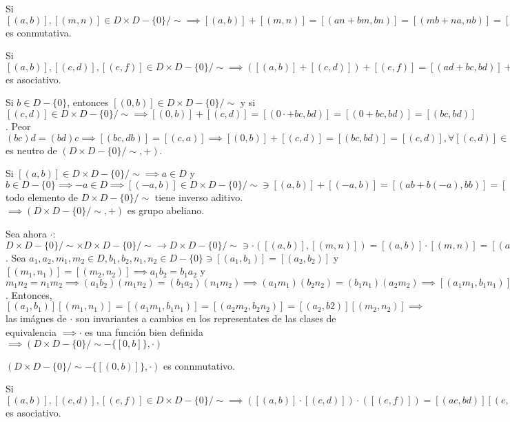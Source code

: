\begin{teorema}[3C]
\begin{dem}
        \bigbreak 
        Si $\left[(a,b)\right],\left[(m,n)\right]\in D\times D-\{0\}/\sim\implies \left[(a,b)\right]+\left[(m,n)\right]=\left[(an+bm,bn)\right]=\left[(mb+na,nb)\right]=\left[(m,n)\right]+[(a,b)]\implies \left(D\times D-\{0\}/\sim, +\right)$ es conmutativa.         \bigbreak 

        Si $[(a,b)],[(c,d)],[(e,f)]\in D\times D-\{0\}/\sim\implies \left([(a,b)]+[(c,d)]\right)+ [(e,f)]= [(ad+bc,bd)]+[(e,f)]=[(ad+bc)f+(bd)e,(bd)f]=\left[(adf+bcf+bde,bdf)\right]= \left[(adf+bcf+bde, bdf)\right] = \left[a(df)+b(cf+de),b(df)\right]=[(a,b)]+[(cf+de,df)]=[(a,b)]+([c,d]+[(d,f)])\implies \left(D\times D-\{0\}/\sim, +\right)$ es asociativo. \bigbreak 

        Si $b\in D-\{0\}$, entonces $[(0,b)]\in D\times D-\{0\}/\sim$ y si $[(c,d)]\in D\times D-\{0\}/\sim \implies [(0,b)]+[(c,d)]=[(0\cdot  +bc, bd)]=[(0+bc,bd)]=[(bc,bd)]$. Peor $(bc)d=(bd)c\implies [(bc,db)]=[(c,a)]\implies [(0,b)]+[(c,d)]=[(bc,bd)]=[(c,d)],\forall [(c,d)]\in D\times D-\{0\}/\sim \implies [(0,b)]$ es neutro de $\left(D\times D-\{0\}/\sim, +\right)$.\bigbreak 

        Si $\left[(a,b)\right]\in D\times D-\{0\}/\sim\implies a\in D$ y $b\in D-\{0\}\implies -a\in D\implies \left[(-a,b)\right]\in D\times D-\{0\}/\sim \ni [(a,b)]
        + [(-a,b)]= [(ab+b(-a),bb)]=[(ab-ab,bb)]=[(0,bb)]=[(0,b)]\implies [(-a,b)]=-[(a,b)]\implies$ todo elemento de $D\times D-\{0\}/\sim$ tiene inverso aditivo. $\implies \left(D\times D-\{0\}/\sim, +\right)$ es grupo abeliano. \bigbreak 

        Sea ahora $\cdot$: $D\times D-\{0\}/\sim \times D\times D-\{0\}/\sim \to D\times D-\{0\}/\sim \ni\cdot\left([(a,b)],[(m,n)]\right)=[(a,b)]\cdot [(m,n)]=[(am,bn)]$. Sea $a_1,a_2,m_1,m_2\in D, b_1,b_2,n_1,n_2\in D-\{0\}\ni [(a_1,b_1)]=[(a_2,b_2)]$ y $[(m_1,n_1)]=[(m_2,n_2)]\implies a_1b_2=b_1a_2$ y $m_1n_2=n_1m_2\implies (a_1b_2)(m_1n_2)=(b_1a_2)(n_1m_2)\implies (a_1m_1)(b_2n_2)=(b_1n_1)(a_2m_2)\implies [(a_1m_1,b_1n_1)]=[(a_2m_2,b_2n_2)]$. Entonces, $[(a_1,b_1)][(m_1,n_1)]=[(a_1m_1,b_1n_1)]=[(a_2m_2,b_2n_2)]=[(a_2,b2)][(m_2,n_2)]\implies$ las imágnes de $\cdot$ son invariantes a cambios en los representates de las clases de equivalencia $\implies \cdot$ es una función bien definida $\implies\left(D\times D-\{0\}/\sim -\{[0,b]\},\cdot\right)$

        $\left(D\times D-\{0\}/\sim - \{[(0,b)]\},\cdot\right)$ es connmutativo. \bigbreak 

        Si $[(a,b)],[(c,d)],[(e,f)]\in D\times D-\{0\}/\sim \implies \left([(a,b)]\cdot [(c,d)]\right)\cdot\left([(e,f)]\right)=[(ac,bd)][(e,f)]=[((ac)e, (bd)f)]=[a(ce), b(df)]=[(a,b)]\cdot [(ce,df)]=[(a,b)]\cdot \left([(c,d)]\cdot [(e,f)]\right)\implies \left(D\times D-\{0\}/\sim - \{[0,b]\},\cdot\right)$ es asociativo. \bigbreak 


\end{dem}
\end{teorema}

